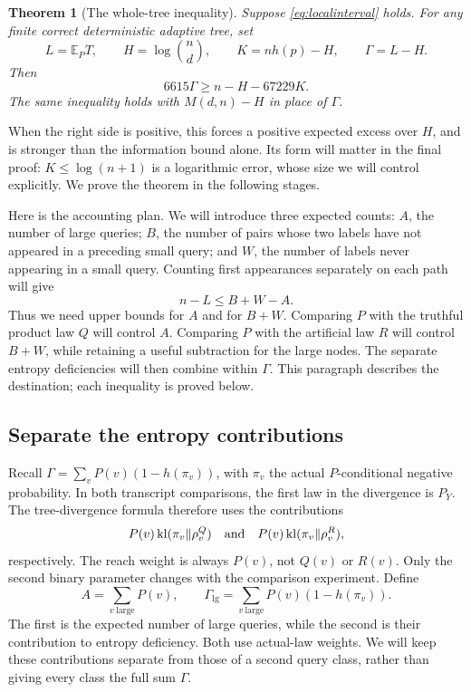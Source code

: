 \documentclass[11pt]{article}
\newtheorem{theorem}{Theorem}[section]
\theoremstyle{definition}
\theoremstyle{remark}
\newcommand{\E}{\mathbb E}
\newcommand{\kl}{\operatorname{kl}}
\newcommand{\Glg}{\Gamma_{\mathrm{lg}}}
\numberwithin{equation}{section}
\begin{document}
\begin{theorem}[The whole-tree inequality]\label{thm:whole}
Suppose \eqref{eq:localinterval} holds. For any finite correct
deterministic adaptive tree, set
\[
 L=\E_P T,\qquad H=\log\binom nd,\qquad
 K=nh(p)-H,\qquad \Gamma=L-H.
\]
Then
\begin{equation}\label{eq:WT}
 \boxed{6615\Gamma\ge n-H-67229K.}
\end{equation}
The same inequality holds with \(M(d,n)-H\) in place of \(\Gamma\).
\end{theorem}

When the right side is positive, this forces a positive expected
excess over \(H\), and is stronger than the information bound alone.
Its form will matter in the final proof: \(K\le\log(n+1)\) is a
logarithmic error, whose size we will control explicitly.
We prove the theorem in the following stages.

Here is the accounting plan. We will introduce three expected counts:
\(A\), the number of large queries; \(B\), the number of pairs whose
two labels have not appeared in a preceding small query; and \(W\),
the number of labels never appearing in a small query. Counting
first appearances separately on each path will give
\[
 n-L\le B+W-A.
\]
Thus we need upper bounds for \(A\) and for \(B+W\). Comparing \(P\)
with the truthful product law \(Q\) will control \(A\). Comparing
\(P\) with the artificial law \(R\) will control \(B+W\), while
retaining a useful subtraction for the large nodes. The separate
entropy deficiencies will then combine within \(\Gamma\).
This paragraph describes the destination; each inequality is proved below.

\subsection{Separate the entropy contributions}

Recall
\(\Gamma=\sum_vP(v)(1-h(\pi_v))\), with \(\pi_v\) the actual
\(P\)-conditional negative probability.
In both transcript comparisons, the first law in the divergence is
\(P_Y\). The tree-divergence formula therefore uses the contributions
\[
 P(v)\kl(\pi_v\Vert\rho_v^Q)
 \quad\hbox{and}\quad
 P(v)\kl(\pi_v\Vert\rho_v^R),
\]
respectively. The reach weight is always \(P(v)\), not \(Q(v)\)
or \(R(v)\). Only the second binary parameter changes with the
comparison experiment.
Define
\[
 A=\sum_{v\ \mathrm{large}}P(v),\qquad
 \Glg=\sum_{v\ \mathrm{large}}P(v)(1-h(\pi_v)).
\]
The first is the expected number of large queries, while the second
is their contribution to entropy deficiency. Both use actual-law
weights. We will keep these contributions separate from those of a
second query class, rather than giving every class the full sum
\(\Gamma\).
\end{document}
